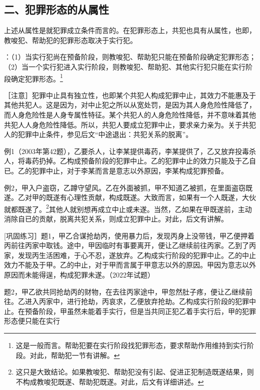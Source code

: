 \subsection*{二、犯罪形态的从属性}

上述从属性是就犯罪成立条件而言的。在犯罪形态上，共犯也具有从属性，也即，教唆犯、帮助犯的犯罪形态取决于实行犯。

：（1）当实行犯尚在预备阶段，则教唆犯、帮助犯只能在预备阶段确定犯罪形态；（2）当一个实行犯进入实行阶段，则教唆犯、帮助犯、其他实行犯只能在实行阶段确定犯罪形态。\footnote{这是一般而言。帮助犯要在实行阶段找犯罪形态，要求帮助作用维持到实行阶段。对此，帮助犯一节有讲解。}

［注意］犯罪中止具有独立性，也即某个共犯人构成犯罪中止，其效力不能惠及于其他共犯人。这是因为，对中止犯之所以从宽处罚，是因为其人身危险性降低了，而人身危险性是人身专属性特征。某个共犯人的人身危险性降低，并不意味着其他共犯人人身危险性降低。所以，共犯人要成立犯罪中止，要求亲力亲为。关于共犯人的犯罪中止条件，参见后文“中途退出：共犯关系的脱离”。


例1（2003年第42题），乙要杀人，让李某提供毒药，李某提供了，乙又放弃投毒杀人，将毒药扔掉。乙构成预备阶段的犯罪中止。乙的犯罪中止的效力只能及于乙自已。乙的犯罪中止，对于李某而言是意志以外原因，李某构成犯罪预备。

例2，甲入户盗窃，乙蹲守望风。乙在外面被抓，甲不知道乙被抓，在里面盗窃既遂。乙对甲的既遂有心理性贡献，构成既遂。大致而言，如果有一个人既遂，大伙就都既遂了。\footnote{这只是大致结论。如果教唆犯、帮助犯没有引起、促进正犯制造既遂结果，则不构成教唆犯既遂、帮助犯既遂。对此，后文有详细讲述。}其他人就别想再成立中止或未遂。当然，乙如果在甲既遂前，主动消除自已的贡献，脱离共犯关系，则成立犯罪中止。对此，后文有讲解。

[巩固练习］题1，甲乙合谋抢劫丙，使用暴力后，发现丙身上没带钱，甲乙便押着丙前往丙家中取钱。途中，甲因临时有事要离开，便让乙继续前往丙家。乙到了丙家，发现丙生活困难，于心不忍，遂放弃。乙构成实行阶段的犯罪中止。乙的中止效力不能及于甲。乙的中止，对于甲而言属于甲意志以外的原因。甲因为意志以外原因而未能得逞，构成犯罪未遂。（2022年试题）

题2，甲乙欲共同抢劫丙的财物，在去往丙家途中，甲忽然肚子疼，便让乙继续前往。乙进入丙家中，进行抢劫，丙哀求，乙便放弃抢劫。乙构成实行阶段的犯罪中止。在预备阶段，甲虽然未能着手实行，但是当共同正犯乙着手实行后，甲的犯罪形态便只能在实行

